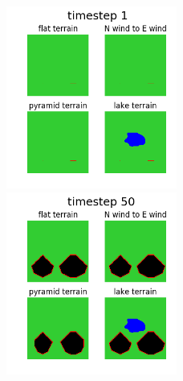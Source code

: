 \documentclass{article}
\begin{document}
\begin{figure}
\includegraphics[width=0.5\textwidth]{figures/multi_im000.png} \includegraphics[width=0.5\textwidth]{figures/multi_im049.png}


\end{figure}
\end{document}
